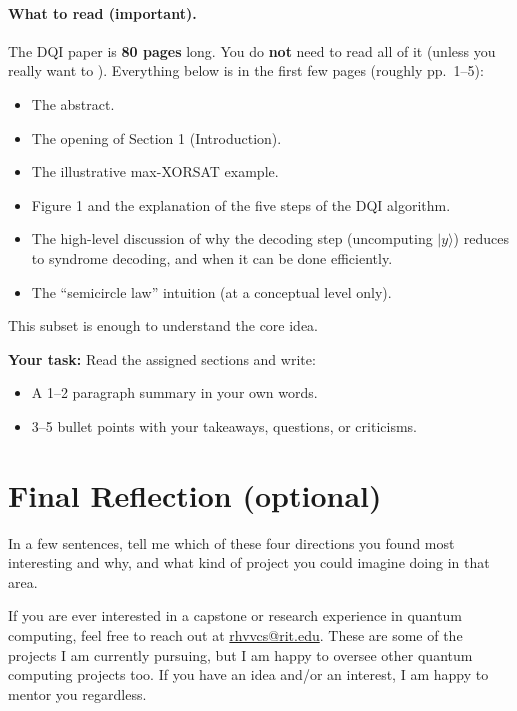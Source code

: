\documentclass[11pt]{article}
\newcommand{\yourtask}[1]{%
  \vspace{0.5em}
  \noindent\textbf{Your task:} #1
  \begin{itemize}
    \item A 1--2 paragraph summary in your own words.
    \item 3--5 bullet points with your takeaways, questions, or criticisms.
  \end{itemize}}
\begin{document}
\paragraph{What to read (important).}
The DQI paper is \textbf{80 pages} long. You do \textbf{not} need to read all of it (unless you
really want to \smiley{}). Everything below is in the first few pages (roughly pp.~1--5):
\begin{itemize}
    \item The abstract.
    \item The opening of Section 1 (Introduction).
    \item The illustrative max-XORSAT example.
    \item Figure 1 and the explanation of the five steps of the DQI algorithm.
    \item The high-level discussion of why the decoding step (uncomputing $|y\rangle$) reduces to
          syndrome decoding, and when it can be done efficiently.
    \item The ``semicircle law'' intuition (at a conceptual level only).
\end{itemize}
This subset is enough to understand the core idea. \smiley{}

\yourtask{Read the assigned sections and write:}

\newpage

\section*{Final Reflection (optional)}

In a few sentences, tell me which of these four directions you found most interesting and why, and
what kind of project you could imagine doing in that area.

\medskip
\noindent If you are ever interested in a capstone or research experience in quantum computing,
feel free to reach out at \href{mailto:rhvvcs@rit.edu}{rhvvcs@rit.edu}. These are some of the
projects I am currently pursuing, but I am happy to oversee other quantum computing projects too. If
you have an idea and/or an interest, I am happy to mentor you regardless. \smiley{}
\end{document}
